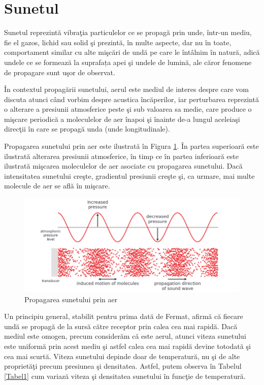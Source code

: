 	\section{Sunetul}
	Sunetul reprezint\u{a} vibra\c{t}ia particulelor ce se propagă prin unde, \^{i}ntr-un mediu, fie el gazos, lichid sau solid \c{s}i prezint\u{a}, \^{i}n multe aspecte, dar nu \^{i}n toate, comportament similar cu alte mi\c{s}c\u{a}ri de und\u{a} pe care le \^{i}nt\^{a}lnim \^{i}n natur\u{a}, adic\u{a} undele ce se formează la suprafața apei \c{s}i undele de lumin\u{a}, ale c\u{a}ror fenomene de propagare sunt u\c{s}or de
	observat.
	 
	
	\^{I}n contextul propag\u{a}rii sunetului, aerul este mediul de interes despre care vom discuta atunci c\^{a}nd vorbim despre acustica \^{i}nc\u{a}perilor, iar perturbarea reprezint\u{a} o alterare a presiunii atmosferice peste \c{s}i sub valoarea sa medie, care produce o mi\c{s}care periodic\u{a} a moleculelor de aer \^{i}napoi \c{s}i \^{i}nainte de-a lungul aceleia\c{s}i direc\c{t}ii \^{i}n care se propag\u{a} unda (unde longitudinale).
	 
	
	Propagarea sunetului prin aer este ilustrat\u{a} în Figura \ref{Fig1}. \^{I}n partea superioar\u{a}
	este ilustrat\u{a} alterarea presiunii atmosferice, \^{i}n timp ce \^{i}n partea inferioar\u{a} este ilustrat\u{a} mi\c{s}carea moleculelor de aer asociate cu propagarea sunetului. Dac\u{a} intensitatea
	sunetului cre\c{s}te, gradientul presiunii cre\c{s}te \c{s}i, ca urmare, mai multe
	molecule de aer se afl\u{a} \^{i}n mi\c{s}care.
	
	\begin{figure}[!htb]
		\centering
		\includegraphics[width=1\linewidth]{imagini/propagareaSunetuluiInAer.png}
		\caption{Propagarea sunetului prin aer\cite{elorza}}
		\label{Fig1}
	\end{figure}

	Un principiu general, stabilit pentru prima dat\u{a} de Fermat, afirm\u{a} c\u{a} fiecare und\u{a} se propag\u{a} de la surs\u{a} c\u{a}tre receptor prin calea cea mai rapid\u{a}. Dac\u{a} mediul este omogen, precum consider\u{a}m c\u{a} este aerul, atunci viteza sunetului este uniform\u{a} prin acest mediu \c{s}i astfel calea cea mai rapid\u{a} devine totodat\u{a} \c{s}i cea mai scurt\u{a}.
	Viteza sunetului depinde doar de temperatur\u{a}, nu \c{s}i de alte propriet\u{a}\c{t}i precum presiunea \c{s}i densitatea. Astfel, putem observa \^{i}n Tabelul \ref{Tabel1} cum variaz\u{a} viteza \c{s}i densitatea sunetului \^{i}n func\c{t}ie de temperatur\u{a}.
	
